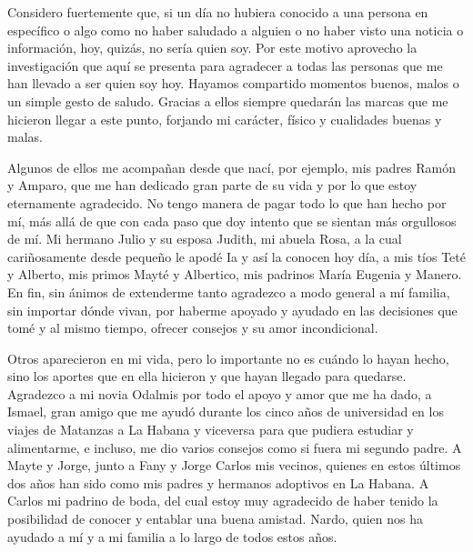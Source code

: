 
\begin{acknowledgements}
	Considero fuertemente que, si un día no hubiera conocido a una persona en específico o algo  como no haber saludado a alguien o no haber visto una noticia o información, hoy, quizás, no sería quien soy. Por este motivo aprovecho la investigación que aquí se presenta para agradecer a todas las personas que me han llevado a ser quien soy hoy. Hayamos compartido momentos buenos, malos o un simple gesto de saludo. Gracias a ellos siempre quedarán las marcas que me hicieron llegar a este punto, forjando mi carácter, físico y cualidades buenas y malas.
	
	Algunos de ellos me acompañan desde que nací, por ejemplo, mis padres Ramón y Amparo, que me han dedicado gran parte de su vida y por lo que estoy eternamente agradecido. No tengo manera de pagar todo lo que han hecho por mí, más allá de que con cada paso que doy intento que se sientan más orgullosos de mí. Mi hermano Julio y su esposa Judith, mi abuela Rosa, a la cual cariñosamente desde pequeño le apodé Ia y así la conocen hoy día, a mis tíos Teté y Alberto, mis primos Mayté y Albertico, mis padrinos María Eugenia y Manero. En fin, sin ánimos de extenderme tanto agradezco a modo general a mí familia, sin importar dónde vivan, por haberme apoyado y ayudado en las decisiones que tomé y al mismo tiempo, ofrecer consejos y su amor incondicional.
	
	Otros aparecieron en mi vida, pero lo importante no es cuándo lo hayan
	hecho, sino los aportes que en ella hicieron y que hayan llegado para quedarse. Agradezco a mi novia Odalmis por todo el apoyo y amor que me ha dado, a Ismael, gran amigo que me ayudó durante los cinco años de universidad en los viajes de Matanzas a La Habana y viceversa para que pudiera estudiar y alimentarme, e incluso, me dio varios consejos como si fuera mi segundo padre. A Mayte y Jorge, junto a Fany y Jorge Carlos mis vecinos, quienes en estos últimos dos años han sido como mis padres y hermanos adoptivos en La Habana. A Carlos mi padrino de boda, del cual estoy muy agradecido de haber tenido la posibilidad de conocer y entablar una buena amistad. Nardo, quien nos ha ayudado a mí y a mi familia a lo largo de todos estos años.
	

\end{acknowledgements}
